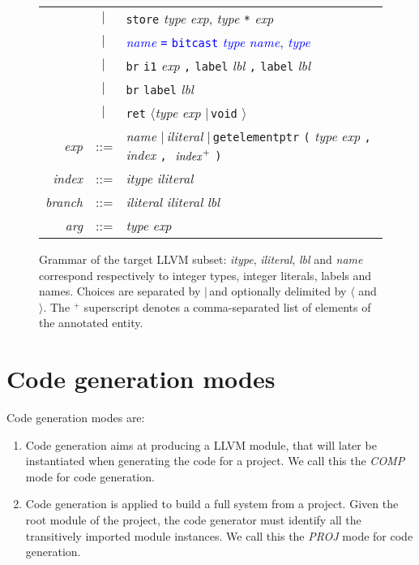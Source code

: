 \documentclass{llncs}
\newcommand{\llvm}[1]{\texttt{#1}}
\newcommand{\lalt}[0]{$\langle$\xspace}
\newcommand{\ralt}[0]{$\rangle$\xspace}
\newcommand{\alt}[0]{$\mid\,$}
\newcommand{\ListOf}[1]{$\mbox{#1}^+$}
\newcommand{\nt}[1]{{\normalfont\textit{#1}}}
\begin{document}
\begin{figure}
\begin{center}
\begin{tabular}{rcl}
      & \alt & \llvm{store} \nt{type} \nt{exp}, \nt{type} \llvm{*} \nt{exp} \\
      & \alt & \textcolor{blue}{\nt{name} \llvm{=} \llvm{bitcast} \nt{type} \nt{name}, \nt{type} }\\
      & \alt & \llvm{br} \llvm{i1} \nt{exp} \llvm{,} \llvm{label} \nt{lbl} \llvm{,} \llvm{label} \nt{lbl} \\
      & \alt & \llvm{br} \llvm{label} \nt{lbl} \\
      & \alt & \llvm{ret} \lalt \nt{type} \nt{exp} \alt \llvm{void} \ralt \\
      \nt{exp} & ::= & \nt{name} \alt \nt{iliteral} \alt \llvm{getelementptr} \llvm{(} \nt{type} \nt{exp} \llvm{,} \nt{index} \llvm{,} \textcolor{blue}{\ListOf{ \nt{index}}}  \llvm{)} \\
      \nt{index} & ::= & \nt{itype} \nt{iliteral} \\
      \nt{branch} & ::= & \nt{iliteral} \nt{iliteral} \nt{lbl} \\
      \nt{arg} & ::= & \nt{type} \nt{exp}
    \end{tabular}
  \end{center}
  \caption{Grammar of the target LLVM subset: \nt{itype}, \nt{iliteral}, \nt{lbl}
    and \nt{name} correspond respectively to integer types, integer literals,
    labels and names. Choices are separated by \alt and optionally delimited by
    \lalt and \ralt.  The \ListOf{} superscript denotes a comma-separated list of
    elements of the annotated entity.}
  \label{fig:llvm-grammar}
\end{figure}

\section{Code generation modes}
\label{sec:overview}

Code generation modes are:
\begin{enumerate}
\item Code generation aims at producing a LLVM module,
  that will later be instantiated when generating the code for a project. We
  call this the \emph{COMP} mode for code generation.
\item Code generation is applied to build a full system from a project. Given
  the root module of the project, the code generator must identify all the
  transitively imported module instances. We call this the \emph{PROJ} mode for
  code generation.
\end{enumerate}
\end{document}
